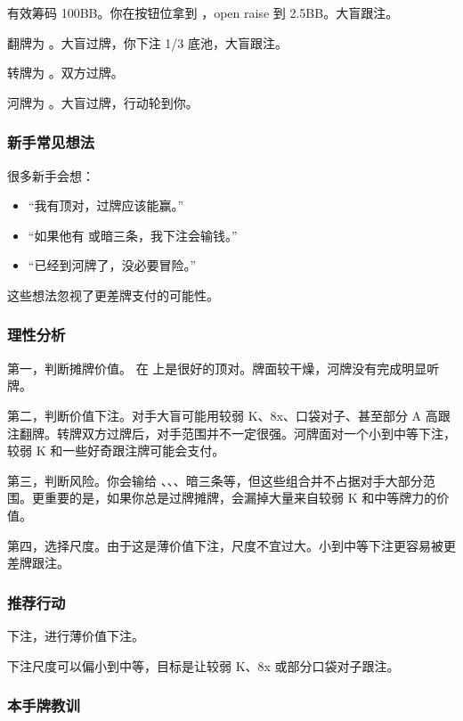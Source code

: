 有效筹码 100BB。你在按钮位拿到 ，open raise 到 2.5BB。大盲跟注。

翻牌为 。大盲过牌，你下注 1/3 底池，大盲跟注。

转牌为 。双方过牌。

河牌为 。大盲过牌，行动轮到你。

\subsubsection*{新手常见想法}

很多新手会想：

\begin{itemize}
\item “我有顶对，过牌应该能赢。”
\item “如果他有  或暗三条，我下注会输钱。”
\item “已经到河牌了，没必要冒险。”
\end{itemize}

这些想法忽视了更差牌支付的可能性。

\subsubsection*{理性分析}

第一，判断摊牌价值。 在  上是很好的顶对。牌面较干燥，河牌没有完成明显听牌。

第二，判断价值下注。对手大盲可能用较弱 K、8x、口袋对子、甚至部分 A 高跟注翻牌。转牌双方过牌后，对手范围并不一定很强。河牌面对一个小到中等下注，较弱 K 和一些好奇跟注牌可能会支付。

第三，判断风险。你会输给 、、、暗三条等，但这些组合并不占据对手大部分范围。更重要的是，如果你总是过牌摊牌，会漏掉大量来自较弱 K 和中等牌力的价值。

第四，选择尺度。由于这是薄价值下注，尺度不宜过大。小到中等下注更容易被更差牌跟注。

\subsubsection*{推荐行动}

下注，进行薄价值下注。

下注尺度可以偏小到中等，目标是让较弱 K、8x 或部分口袋对子跟注。

\subsubsection*{本手牌教训}

